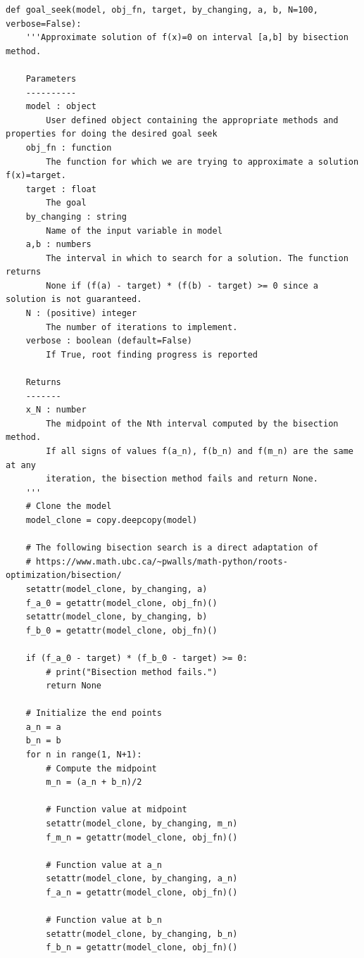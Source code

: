 \documentclass[ited]{informs3}                      %
\begin{document}
\begin{listing}
\centering
\begin{verbatim}
def goal_seek(model, obj_fn, target, by_changing, a, b, N=100, verbose=False):
    '''Approximate solution of f(x)=0 on interval [a,b] by bisection method.

    Parameters
    ----------
    model : object
        User defined object containing the appropriate methods and properties for doing the desired goal seek
    obj_fn : function
        The function for which we are trying to approximate a solution f(x)=target.
    target : float
        The goal
    by_changing : string
        Name of the input variable in model
    a,b : numbers
        The interval in which to search for a solution. The function returns
        None if (f(a) - target) * (f(b) - target) >= 0 since a solution is not guaranteed.
    N : (positive) integer
        The number of iterations to implement.
    verbose : boolean (default=False)
        If True, root finding progress is reported

    Returns
    -------
    x_N : number
        The midpoint of the Nth interval computed by the bisection method. 
        If all signs of values f(a_n), f(b_n) and f(m_n) are the same at any
        iteration, the bisection method fails and return None.
    '''  
    # Clone the model
    model_clone = copy.deepcopy(model)
    
    # The following bisection search is a direct adaptation of
    # https://www.math.ubc.ca/~pwalls/math-python/roots-optimization/bisection/  
    setattr(model_clone, by_changing, a)
    f_a_0 = getattr(model_clone, obj_fn)()
    setattr(model_clone, by_changing, b)
    f_b_0 = getattr(model_clone, obj_fn)()
    
    if (f_a_0 - target) * (f_b_0 - target) >= 0:
        # print("Bisection method fails.")
        return None
    
    # Initialize the end points
    a_n = a
    b_n = b
    for n in range(1, N+1):
        # Compute the midpoint
        m_n = (a_n + b_n)/2
        
        # Function value at midpoint
        setattr(model_clone, by_changing, m_n)
        f_m_n = getattr(model_clone, obj_fn)()
        
        # Function value at a_n
        setattr(model_clone, by_changing, a_n)
        f_a_n = getattr(model_clone, obj_fn)()
        
        # Function value at b_n
        setattr(model_clone, by_changing, b_n)
        f_b_n = getattr(model_clone, obj_fn)()
        

\end{verbatim}
\end{listing}
\end{document}
